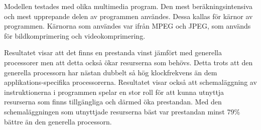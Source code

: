 \documentclass{popsci}
\begin{document}
{%

Modellen testades med olika multimedia program. Den mest beräkningsintensiva och mest upprepande delen av programmen användes. Dessa kallas för kärnor av programmen. Kärnorna som användes var ifrån MPEG och JPEG, som används för bildkomprimering och videokomprimering.


Resultatet visar att det finns en prestanda vinst jämfört med generella processorer men att detta också ökar resurserna som behövs. Detta trots att den generella processorn har nästan dubbelt så hög klockfrekvens än dem applikations-specifika processorerna. Resultatet visar också att schemaläggning av instruktionerna i programmen spelar en stor roll för att kunna utnyttja resurserna som finns tillgängliga och därmed öka prestandan. Med den schemaläggningen som utnyttjade resurserna bäst var prestandan minst 79\% bättre än den generella processorn.
}
\end{document}
